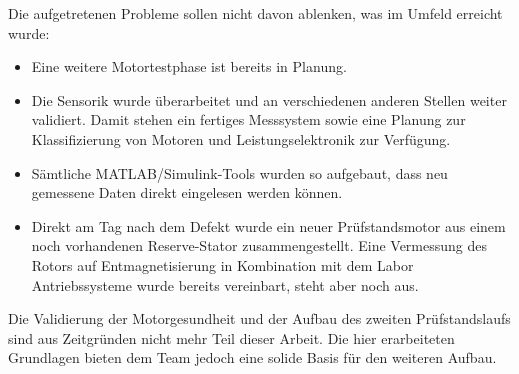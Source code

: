 Die aufgetretenen Probleme sollen nicht davon ablenken, was im Umfeld erreicht wurde:
\begin{itemize}
    \item Eine weitere Motortestphase ist bereits in Planung.
    \item Die Sensorik wurde überarbeitet und an verschiedenen anderen Stellen weiter validiert. Damit stehen ein fertiges Messsystem sowie eine Planung zur Klassifizierung von Motoren und Leistungselektronik zur Verfügung.
    \item Sämtliche MATLAB/Simulink-Tools wurden so aufgebaut, dass neu gemessene Daten direkt eingelesen werden können.
    \item Direkt am Tag nach dem Defekt wurde ein neuer Prüfstandsmotor aus einem noch vorhandenen Reserve-Stator zusammengestellt. Eine Vermessung des Rotors auf Entmagnetisierung in Kombination mit dem Labor Antriebssysteme wurde bereits vereinbart, steht aber noch aus.
\end{itemize}

Die Validierung der Motorgesundheit und der Aufbau des zweiten Prüfstandslaufs sind aus Zeitgründen nicht mehr Teil dieser Arbeit. Die hier erarbeiteten Grundlagen bieten dem Team jedoch eine solide Basis für den weiteren Aufbau.